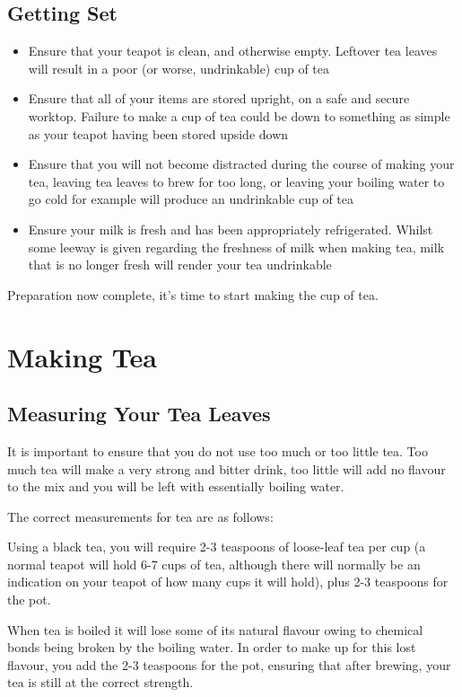 \documentclass{article}
\begin{document}
\subsection{Getting Set}

\begin{itemize}
\item Ensure that your teapot is clean, and otherwise empty. Leftover tea leaves will result in a poor (or worse, undrinkable) cup of tea
\item Ensure that all of your items are stored upright, on a safe and secure worktop. Failure to make a 
cup of tea could be down to something as simple as your teapot having been stored upside down
\item Ensure that you will not become distracted during the course of making your tea, leaving tea leaves 
to brew for too long, or leaving your boiling water to go cold for example will produce an undrinkable cup
of tea
\item Ensure your milk is fresh and has been appropriately refrigerated. Whilst some leeway is given regarding the freshness of milk when making tea, milk that is no longer fresh will render your tea undrinkable
\end{itemize}
\noindent
Preparation now complete, it's time to start making the cup of tea.

\section{Making Tea}
\subsection{Measuring Your Tea Leaves}
It is important to ensure that you do not use too much or too little tea. Too much tea will make a very strong and bitter drink, too little will add no flavour to the mix and you will be left with essentially boiling water.

\bigskip\noindent
The correct measurements for tea are as follows:

\bigskip\noindent
Using a black tea, you will require 2-3 teaspoons of loose-leaf tea per cup (a normal teapot will hold 6-7 cups of tea, although there will normally be an indication on your teapot of how many cups it will hold), plus 2-3 teaspoons for the pot.

\bigskip\noindent
When tea is boiled it will lose some of its natural flavour owing to chemical bonds being broken by the boiling water. In order to make up for this lost flavour, you add the 2-3 teaspoons for the pot, ensuring that after brewing, your tea is still at the correct strength.
\end{document}

